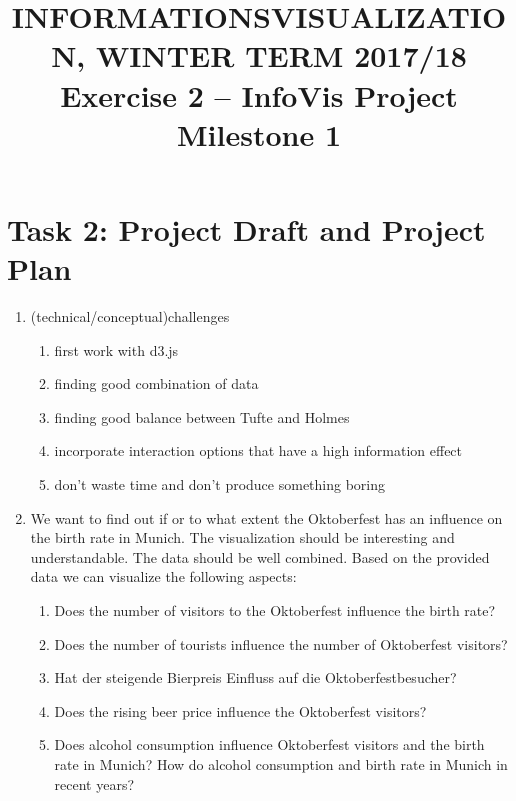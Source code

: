 \documentclass[11pt, twoside, BCOR=8mm, DIV=12]{scrartcl}
\title{{\Large INFORMATIONSVISUALIZATION, WINTER TERM 2017/18} \\ Exercise 2 – InfoVis Project Milestone 1}
\begin{document}
\maketitle
\section*{Task 2: Project Draft and Project Plan}
\begin{enumerate}[label=\alph*)]
\item (technical/conceptual)challenges
\begin{enumerate}[label=\arabic*)]
\item first work with d3.js
\item finding good combination of data
\item finding good balance between Tufte and Holmes
\item incorporate interaction options that have a high information effect
\item don't waste time and don't produce something boring
\end{enumerate}
\item We want to find out if or to what extent the Oktoberfest has an influence on the birth rate in Munich.
The visualization should be interesting and understandable.
The data should be well combined.
Based on the provided data we can visualize the following aspects:
\begin{enumerate}[label=\arabic*)]
\item Does the number of visitors to the Oktoberfest influence the birth rate?
\item Does the number of tourists influence the number of Oktoberfest visitors?
\item Hat der steigende Bierpreis Einfluss auf die Oktoberfestbesucher?
\item Does the rising beer price influence the Oktoberfest visitors?
\item Does alcohol consumption influence Oktoberfest visitors and the birth rate in Munich? How do alcohol consumption and birth rate in Munich in recent years?
\end{enumerate}
\end{enumerate}
\end{document}
